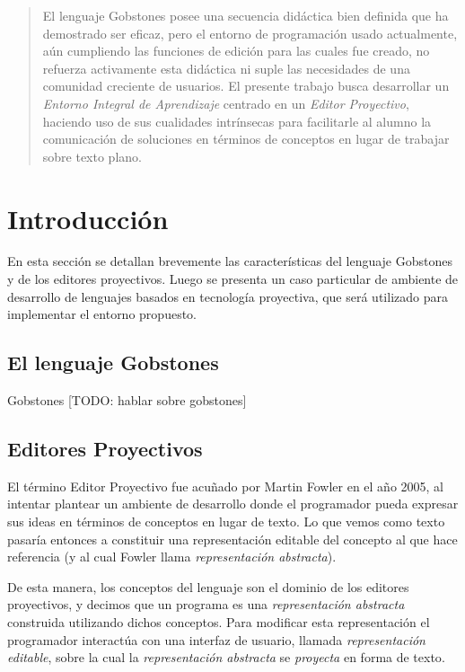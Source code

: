 \begin{abstract}
El lenguaje Gobstones posee una secuencia didáctica bien definida que ha demostrado ser eficaz, pero el entorno de programación usado actualmente, aún cumpliendo las funciones de edición para las cuales fue creado, no refuerza activamente esta didáctica ni suple las necesidades de una comunidad creciente de usuarios. El presente trabajo busca desarrollar un \textit{Entorno Integral de Aprendizaje} centrado en un \textit{Editor Proyectivo}, haciendo uso de sus cualidades intrínsecas para facilitarle al alumno la comunicación de soluciones en términos de conceptos en lugar de trabajar sobre texto plano.
\end{abstract}


\section{Introducción}

En esta sección se detallan brevemente las características del lenguaje Gobstones y de los editores proyectivos. Luego se presenta un caso particular de ambiente de desarrollo de lenguajes basados en tecnología proyectiva, que será utilizado para implementar el entorno propuesto.


\subsection{El lenguaje Gobstones}

Gobstones\cite{Gobstones} [TODO: hablar sobre gobstones]

\subsection{Editores Proyectivos}

El término Editor Proyectivo fue acuñado por Martin Fowler en el año 2005\cite{Fowler}, al intentar plantear un ambiente de desarrollo donde el programador pueda expresar sus ideas en términos de conceptos en lugar de texto. Lo que vemos como texto pasaría entonces a constituir una representación editable del concepto al que hace referencia (y al cual Fowler llama \textit{representación abstracta}).

De esta manera, los conceptos del lenguaje son el dominio de los editores proyectivos, y decimos que un programa es una \textit{representación abstracta} construida utilizando dichos conceptos. Para modificar esta representación el programador interactúa con una interfaz de usuario, llamada \textit{representación editable}, sobre la cual la \textit{representación abstracta} se \textit{proyecta} en forma de texto\cite{voelter2014projectional}. 

